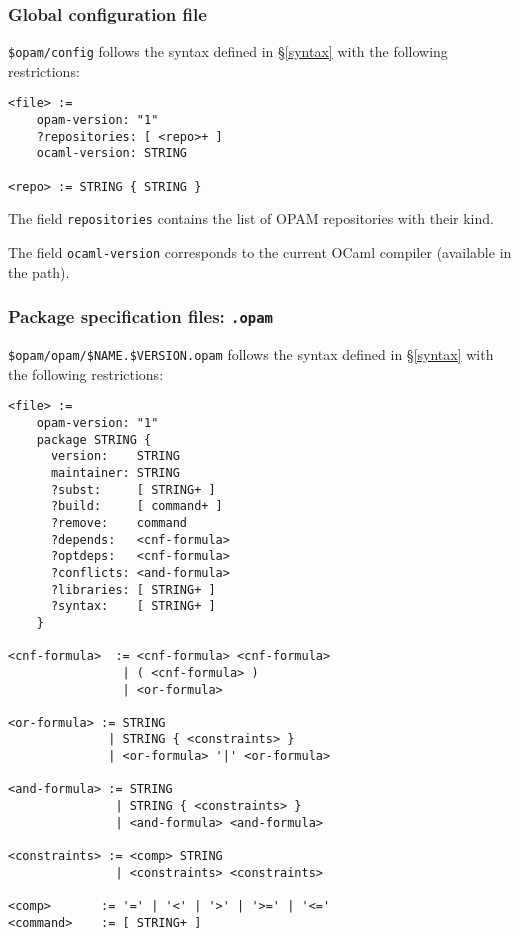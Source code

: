\documentclass[a4paper,11pt]{article}
\begin{document}
\subsubsection{Global configuration file}
\label{config}

\verb+$opam/config+ follows the syntax defined in \S\ref{syntax} with
the following restrictions:

{\small
\begin{Verbatim}[frame=single]
<file> :=
    opam-version: "1"
    ?repositories: [ <repo>+ ]
    ocaml-version: STRING

<repo> := STRING { STRING }
\end{Verbatim}
}

The field {\tt repositories} contains the list of OPAM
repositories with their kind.

The field {\tt ocaml-version} corresponds to the current OCaml
compiler (available in the path).

\subsubsection{Package specification files: {\tt .opam}}
\label{dotopam}

\verb+$opam/opam/$NAME.$VERSION.opam+ follows the syntax defined in
\S\ref{syntax} with the following restrictions:

{\small
\begin{Verbatim}[frame=single]
<file> :=
    opam-version: "1"
    package STRING {
      version:    STRING
      maintainer: STRING
      ?subst:     [ STRING+ ]
      ?build:     [ command+ ]
      ?remove:    command
      ?depends:   <cnf-formula>
      ?optdeps:   <cnf-formula>
      ?conflicts: <and-formula>
      ?libraries: [ STRING+ ]
      ?syntax:    [ STRING+ ]
    }

<cnf-formula>  := <cnf-formula> <cnf-formula>
                | ( <cnf-formula> )
                | <or-formula>

<or-formula> := STRING
              | STRING { <constraints> }
              | <or-formula> '|' <or-formula>

<and-formula> := STRING
               | STRING { <constraints> }
               | <and-formula> <and-formula>

<constraints> := <comp> STRING
               | <constraints> <constraints>

<comp>       := '=' | '<' | '>' | '>=' | '<='
<command>    := [ STRING+ ]
\end{Verbatim}
}
\end{document}
